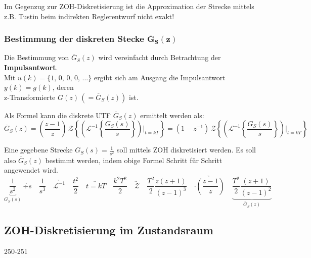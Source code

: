 \smallskip

Im Gegenzug zur ZOH-Diskretisierung ist die Approximation der Strecke mittels z.B. Tustin beim indirekten Reglerentwurf nicht exakt!


\subsubsection{Bestimmung der diskreten Stecke $\bm{\overline{G}_S(z)}$}

Die Bestimmung von $\overline{G}_S(z)$ wird vereinfacht durch Betrachtung der \textbf{Impulsantwort}. \\
Mit $u(k) = \{ 1, \, 0, \, 0, \, 0, \, \ldots \}$ ergibt sich am Ausgang die Impulsantwort $y(k) = g(k)$, deren \\
z-Transformierte $ G(z) \, (= \overline{G}_S(z))$ ist.

\smallskip

Als Formel kann die diskrete UTF $\overline{G}_S(z)$ ermittelt werden als:
\vspace{-0.2cm}
$$ \boxed{ \overline{G}_S(z)    = \left(\frac{z-1}{z} \right) \, \mathcal{Z} \left\{ \left( \mathcal{L}^{-1} \left\{ \frac{G_S(s)}{s} \right\} \right) \Bigg|_{t = kT} \right\}
                                = (1 - z^{-1}) \, \mathcal{Z} \left\{ \left( \mathcal{L}^{-1} \left\{ \frac{G_S(s)}{s} \right\} \right) \Bigg|_{t = kT} \right\} } $$
                       


Eine gegebene Strecke $G_S(s) = \frac{1}{s^2}$ soll mittels ZOH diskretisiert werden. 
Es soll also $\overline{G}_S(z)$ bestimmt werden, indem obige Formel Schritt für Schritt angewendet wird.
\vspace{-0.2cm}
\[
    \underbrace{ \frac{1}{s^2} }_{G_S(s)} \
    \underrightarrow{\div s} \quad 
    \frac{1}{s^3} \quad 
    \underrightarrow{\mathcal{L}^{-1}} \quad 
    \frac{t^2}{2} \quad
    \underrightarrow{t = kT} \quad 
    \frac{k^2 T^2}{2} \quad
    \underrightarrow{\mathcal{Z}} \quad 
    \frac{T^2}{2} \frac{z (z+1)}{(z-1)^3} \quad
    \underrightarrow{\cdot \left( \frac{z-1}{z} \right)} \quad 
    \underbrace{ \frac{T^2}{2} \frac{(z+1)}{(z-1)^2}}_{\overline{G}_S(z)}
\]

\vspace{-0.4cm}

\subsection{ZOH-Diskretisierung im Zustandsraum}{250-251}
\label{ZOH-Diskretisierung im Zustandsraum}

